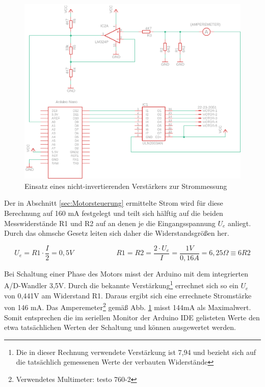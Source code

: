 \documentclass[11pt, titlepage, fleqn]{report}
\begin{document}
				\begin{figure}[htbp]
					\centering
					\includegraphics[width=\linewidth]{./img/op2.png}
					\caption{Einsatz eines nicht-invertierenden Verstärkers zur Strommessung
					\label{fig:imgOP}}			
				\end{figure}
				\newpage

				Der in Abschnitt \ref{sec:Motorsteuerung} ermittelte Strom wird für diese Berechnung auf 160 mA festgelegt und teilt sich hälftig auf die beiden Messwiderstände R1 und R2 auf an denen je die Eingangsspannung $U_{e}$ anliegt. Durch das ohmsche Gesetz leiten sich daher die Widerstandsgrößen her.

				\begin{equation}
					U_{e}=R1\cdot\frac{I}{2}=0,5V \hspace{6em} R1=R2=\frac{2\cdot U_{e}}{I}=\frac{1V}{0,16A}=6,25\Omega \equiv 6R2
				\end{equation}

				Bei Schaltung einer Phase des Motors misst der Arduino mit dem integrierten A/D-Wandler 3,5V. Durch die bekannte Verstärkung\footnote{Die in dieser Rechnung verwendete Verstärkung ist 7,94 und bezieht sich auf die tatsächlich gemessenen Werte der verbauten Widerstände} errechnet sich so ein $U_{e}$ von 0,441V am Widerstand R1. Daraus ergibt sich eine errechnete Stromstärke von 146 mA. Das Amperemeter\footnote{Verwendetes Multimeter: testo 760-2} gemäß Abb. \ref{fig:imgOP} misst 144mA als Maximalwert. Somit entsprechen die im seriellen Monitor der Arduino IDE gelisteten Werte den etwa tatsächlichen Werten der Schaltung und können ausgewertet werden.
\end{document}
